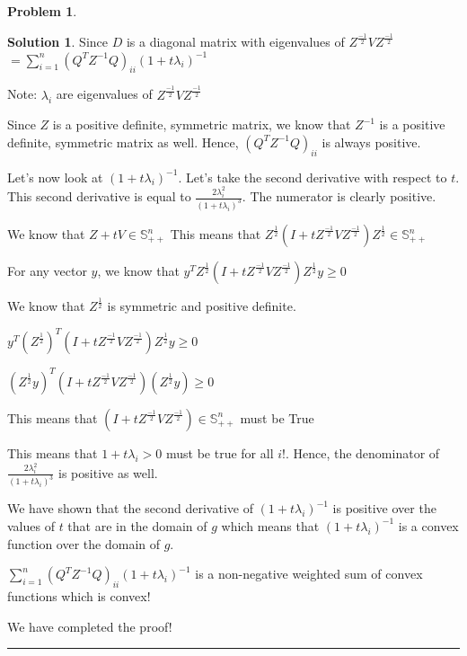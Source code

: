 \documentclass{article}
\theoremstyle{definition}
\newtheorem{problem}{Problem}
\def\fline{\rule{0.75\linewidth}{0.5pt}}
\newcommand{\finishline}{\begin{center}\fline\end{center}}
\newtheorem*{solution*}{Solution}
\newenvironment{solution}{\begin{solution*}}{{\finishline} \end{solution*}}
\begin{document}
\begin{problem}
\begin{itemize}
\begin{solution}
            Since $D$ is a diagonal matrix with eigenvalues of $Z^{\frac{-1}{2}} V Z^{\frac{-1}{2}}$ \newline 
            $= \sum_{i=1}^{n} (Q^TZ^{-1} Q)_{ii} (1 + t\lambda_i)^{-1}$

            Note: $\lambda_i$ are eigenvalues of $Z^{\frac{-1}{2}} V Z^{\frac{-1}{2}}$ 

            Since $Z$ is a positive definite, symmetric matrix, we know that $Z^{-1}$ is a positive definite, symmetric matrix as well. Hence, $(Q^TZ^{-1} Q)_{ii}$ is always positive. \newline 

            Let's now look at $(1 + t\lambda_i)^{-1}$. Let's take the second derivative with respect to $t$. This second derivative is equal to $\frac{2\lambda_i^2}{(1 + t\lambda_i)^3}$. The numerator is clearly positive. \newline 

            We know that $Z + tV \in \mathbb{S}^n_{++}$ \newline 
            This means that $Z^{\frac{1}{2}} (I + tZ^{\frac{-1}{2}} V Z^{\frac{-1}{2}}) Z^{\frac{1}{2}} \in \mathbb{S}^n_{++}$ \newline 

            For any vector $y$, we know that $y^T Z^{\frac{1}{2}} (I + tZ^{\frac{-1}{2}} V Z^{\frac{-1}{2}}) Z^{\frac{1}{2}} y \geq 0$ \newline 

            We know that $Z^{\frac{1}{2}}$ is symmetric and positive definite. \newline 

            $y^T (Z^{\frac{1}{2}})^T (I + tZ^{\frac{-1}{2}} V Z^{\frac{-1}{2}}) Z^{\frac{1}{2}} y \geq 0$ \newline 

            $(Z^{\frac{1}{2}} y)^T (I + tZ^{\frac{-1}{2}} V Z^{\frac{-1}{2}}) (Z^{\frac{1}{2}} y) \geq 0$ \newline 
            
            This means that $(I + tZ^{\frac{-1}{2}} V Z^{\frac{-1}{2}}) \in \mathbb{S}^n_{++}$ must be True

            This means that $1 + t\lambda_i > 0$ must be true for all $i$!. Hence, the denominator of $\frac{2\lambda_i^2}{(1 + t\lambda_i)^3}$ is positive as well. 

            We have shown that the second derivative of $(1 + t\lambda_i)^{-1}$ is positive over the values of $t$ that are in the domain of $g$ which means that $(1 + t\lambda_i)^{-1}$ is a convex function over the domain of $g$.

            $\sum_{i=1}^{n} (Q^TZ^{-1} Q)_{ii} (1 + t\lambda_i)^{-1}$ is a non-negative weighted sum of convex functions which is convex!

            We have completed the proof!

        \end{solution}  
    \end{itemize}
\end{problem}
\end{document}
